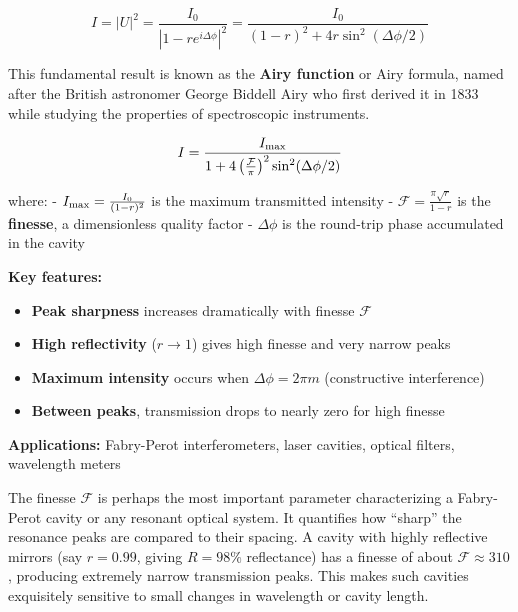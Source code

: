\documentclass[
  a4paper,
]{book}
\providecommand{\tightlist}{%
  \setlength{\itemsep}{0pt}\setlength{\parskip}{0pt}}
\begin{document}
\[
I=|U|^2=\frac{I_{0}}{|1-re^{i\Delta\phi}|^2}=\frac{I_0}{(1-r)^2+4r\sin^2(\Delta\phi/2)}
\]

This fundamental result is known as the \textbf{Airy function} or Airy
formula, named after the British astronomer George Biddell Airy who
first derived it in 1833 while studying the properties of spectroscopic
instruments.

\begin{tcolorbox}[enhanced jigsaw, breakable, toptitle=1mm, bottomrule=.15mm, colbacktitle=quarto-callout-important-color!10!white, title=\textcolor{quarto-callout-important-color}{\faExclamation}\hspace{0.5em}{Airy Function: Multiple Reflections with Losses}, arc=.35mm, rightrule=.15mm, bottomtitle=1mm, opacityback=0, toprule=.15mm, coltitle=black, leftrule=.75mm, opacitybacktitle=0.6, colback=white, left=2mm, titlerule=0mm, colframe=quarto-callout-important-color-frame]

\[I=\frac{I_{\rm max}}{1+4\left(\frac{\mathcal{F}}{\pi}\right)^2\sin^{2}(\Delta\phi/2)}\]

where: - \(I_{\rm max}=\frac{I_0}{(1-r)^2}\) is the maximum transmitted
intensity - \(\mathcal{F}=\frac{\pi \sqrt{r}}{1-r}\) is the
\textbf{finesse}, a dimensionless quality factor - \(\Delta\phi\) is the
round-trip phase accumulated in the cavity

\textbf{Key features:}

\begin{itemize}
\tightlist
\item
  \textbf{Peak sharpness} increases dramatically with finesse
  \(\mathcal{F}\)
\item
  \textbf{High reflectivity} (\(r \to 1\)) gives high finesse and very
  narrow peaks
\item
  \textbf{Maximum intensity} occurs when \(\Delta\phi = 2\pi m\)
  (constructive interference)
\item
  \textbf{Between peaks}, transmission drops to nearly zero for high
  finesse
\end{itemize}

\textbf{Applications:} Fabry-Perot interferometers, laser cavities,
optical filters, wavelength meters

\end{tcolorbox}

The finesse \(\mathcal{F}\) is perhaps the most important parameter
characterizing a Fabry-Perot cavity or any resonant optical system. It
quantifies how ``sharp'' the resonance peaks are compared to their
spacing. A cavity with highly reflective mirrors (say \(r = 0.99\),
giving \(R = 98\%\) reflectance) has a finesse of about
\(\mathcal{F} \approx 310\), producing extremely narrow transmission
peaks. This makes such cavities exquisitely sensitive to small changes
in wavelength or cavity length.
\end{document}
